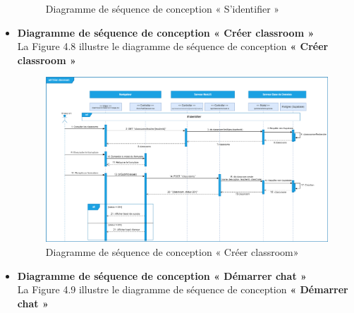 \begin{itemize}[itemsep=1pt, parsep=1pt]
\begin{figure}[H]
            \caption{Diagramme de séquence de conception « S’identifier »}
            \label{fig:Diagramme de séquence de conception « S’identifier »}    
        \end{figure}
    \item \textbf{Diagramme de séquence de conception « Créer classroom » }\\
        La Figure 4.8 illustre le diagramme de séquence de conception \textbf{« Créer classroom »} 
        \begin{figure}[H]
            \centering
            \includegraphics[width=1.25\textwidth,height=1.1\textwidth,angle=90]{images/chp4/fig8.png}
            \caption{Diagramme de séquence de conception « Créer classroom»}
            \label{fig:Diagramme de séquence de conception « Créer classroom»}    
        \end{figure}
    \item \textbf{Diagramme de séquence de conception « Démarrer chat »}\\
    La Figure 4.9 illustre le diagramme de séquence de conception \textbf{« Démarrer chat »} 
    \begin{figure}[H]
        \centering

\end{figure}
\end{itemize}
